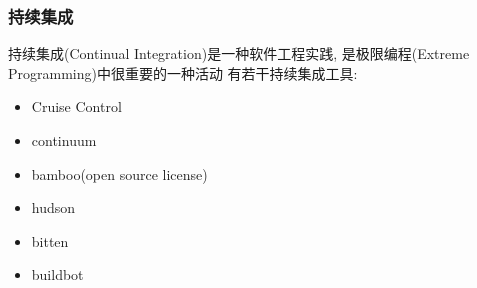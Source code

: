 \documentclass[compress]{beamer}
\begin{document}
\begin{frame}
  \frametitle{持续集成}
  持续集成(Continual Integration)是一种软件工程实践, 
  是极限编程(Extreme Programming)中很重要的一种活动
  有若干持续集成工具:
  \begin{itemize}
	\item Cruise Control
	\item continuum
	\item bamboo(open source license) 
	\item hudson
	\item bitten
	\item buildbot
  \end{itemize}
\end{frame}
\end{document}
